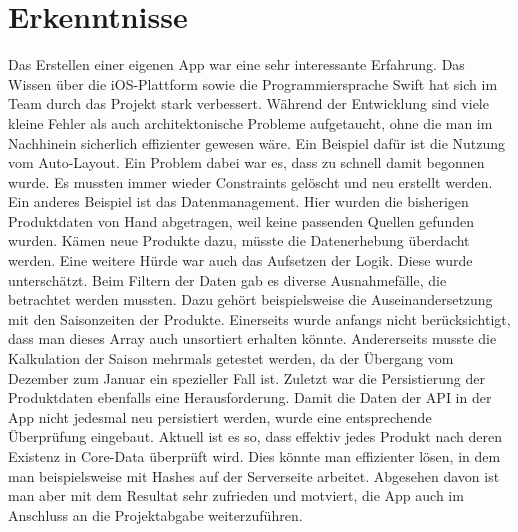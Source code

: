 \documentclass[12pt,titlepage]{article}
\begin{document}
\section*{Erkenntnisse}
Das Erstellen einer eigenen App war eine sehr interessante Erfahrung. Das Wissen über die iOS-Plattform sowie die Programmiersprache \glqq Swift\grqq{} hat sich im Team durch das Projekt stark verbessert. Während der Entwicklung sind viele kleine Fehler als auch architektonische Probleme aufgetaucht, ohne die man im Nachhinein sicherlich effizienter gewesen wäre. Ein Beispiel dafür ist die Nutzung vom Auto-Layout. Ein Problem dabei war es, dass zu schnell damit begonnen wurde. Es mussten immer wieder Constraints gelöscht und neu erstellt werden. Ein anderes Beispiel ist das Datenmanagement. Hier wurden die bisherigen Produktdaten von Hand abgetragen, weil keine passenden Quellen gefunden wurden. Kämen neue Produkte dazu, müsste die Datenerhebung überdacht werden. Eine weitere Hürde war auch das Aufsetzen der Logik. Diese wurde unterschätzt. Beim Filtern der Daten gab es diverse Ausnahmefälle, die betrachtet werden mussten. Dazu gehört beispielsweise die Auseinandersetzung mit den Saisonzeiten der Produkte. Einerseits wurde anfangs nicht berücksichtigt, dass man dieses Array auch unsortiert erhalten könnte. Andererseits musste die Kalkulation der Saison mehrmals getestet werden, da der Übergang vom Dezember zum Januar ein spezieller Fall ist. Zuletzt war die Persistierung der Produktdaten ebenfalls eine Herausforderung. Damit die Daten der API in der App nicht jedesmal neu persistiert werden, wurde eine entsprechende Überprüfung eingebaut. Aktuell ist es so, dass effektiv jedes Produkt nach deren Existenz in Core-Data überprüft wird. Dies könnte man effizienter lösen, in dem man beispielsweise mit Hashes auf der Serverseite arbeitet. Abgesehen davon ist man aber mit dem Resultat sehr zufrieden und motviert, die App auch im Anschluss an die Projektabgabe weiterzuführen.
\end{document}

